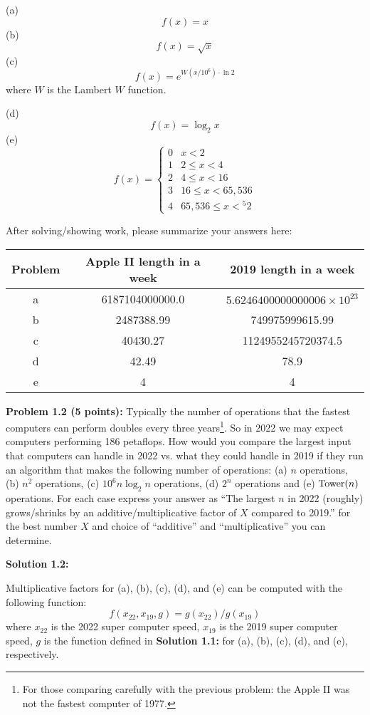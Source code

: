 \documentclass[11pt]{article}
\begin{document}
(a)
\[ f(x) = x \]
(b)
\[ f(x) = \sqrt{x} \]
(c)
\[ f(x) = e^{W(x / 10^6) \cdot \ln{2}} \]
where $W$ is the Lambert $W$ function.

(d)
\[ f(x) = \log_2{x} \]
(e)
\[ f(x) = \begin{cases} 
	0 & x < 2 \\
	1 & 2 \leq x < 4 \\
	2 & 4 \leq x < 16 \\
	3 & 16 \leq x < 65,536 \\
	4 & 65,536 \leq x < {^{5}2}
 \end{cases}
\]

After solving/showing work, please summarize your answers here:

\begin{center}
\begin{tabular}{ |c|c|c| }
 \hline
 Problem & Apple II length in a week & 2019 length in a week \\
 \hline
 a & 6187104000000.0 & $5.6246400000000006 \times 10^{23}$ \\
 \hline
 b & 2487388.99 & 749975999615.99 \\
 \hline
 c & 40430.27 & 1124955245720374.5 \\
 \hline
 d & 42.49 & 78.9 \\
 \hline
 e & 4 & 4 \\
 \hline
\end{tabular}
\end{center}

\newpage

\textbf{Problem 1.2 (5 points):}
Typically the number of operations that the fastest computers can perform doubles every three years\footnote{For those comparing carefully with the previous problem: the Apple II was not the fastest computer of 1977.}.  So in 2022 we may expect computers performing 186 petaflops. How would you compare the largest input that computers can handle in 2022 vs. what they could handle in 2019 if they run an algorithm that makes the following number of operations:
(a) $n$ operations, (b) $n^2$ operations, (c) $10^6 n \log_2 n$ operations, (d) $2^n$ operations and (e) $\mathrm{Tower}(n)$ operations. For each case express your answer as ``The largest $n$ in 2022 (roughly) grows/shrinks by an additive/multiplicative factor of $X$ compared to 2019.'' for the best number $X$ and choice of ``additive'' and ``multiplicative'' you can determine.

\textbf{Solution 1.2:} %

Multiplicative factors for (a), (b), (c), (d), and (e) can be computed with the following function:
\[ f(x_{22}, x_{19}, g) = g(x_{22}) / g(x_{19}) \]
where  $x_{22}$ is the 2022 super computer speed, $x_{19}$ is the 2019 super computer speed, $g$ is the function defined in \textbf{Solution 1.1:} for (a), (b), (c), (d), and (e), respectively.
\end{document}
